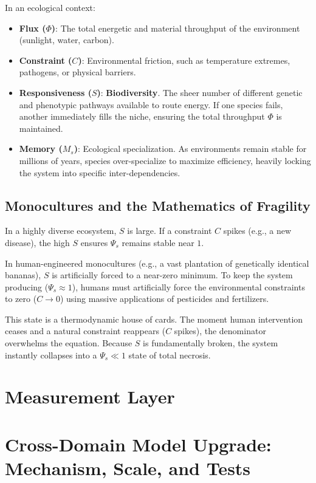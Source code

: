 \documentclass[11pt,a4paper]{article}
\begin{document}
In an ecological context:
\begin{itemize}
    \item \textbf{Flux ($\Phi$)}: The total energetic and material throughput of the environment (sunlight, water, carbon).
    \item \textbf{Constraint ($C$)}: Environmental friction, such as temperature extremes, pathogens, or physical barriers.
    \item \textbf{Responsiveness ($S$)}: \textbf{Biodiversity}. The sheer number of different genetic and phenotypic pathways available to route energy. If one species fails, another immediately fills the niche, ensuring the total throughput $\Phi$ is maintained.
    \item \textbf{Memory ($M_s$)}: Ecological specialization. As environments remain stable for millions of years, species over-specialize to maximize efficiency, heavily locking the system into specific inter-dependencies.
\end{itemize}

\subsection{Monocultures and the Mathematics of Fragility}
In a highly diverse ecosystem, $S$ is large. If a constraint $C$ spikes (e.g., a new disease), the high $S$ ensures $\Psi_s$ remains stable near $1$.

In human-engineered monocultures (e.g., a vast plantation of genetically identical bananas), $S$ is artificially forced to a near-zero minimum. To keep the system producing ($\Psi_s \approx 1$), humans must artificially force the environmental constraints to zero ($C \to 0$) using massive applications of pesticides and fertilizers.

This state is a thermodynamic house of cards. The moment human intervention ceases and a natural constraint reappears ($C$ spikes), the denominator overwhelms the equation. Because $S$ is fundamentally broken, the system instantly collapses into a $\Psi_s \ll 1$ state of total necrosis.



\section{Measurement Layer}

\section{Cross-Domain Model Upgrade: Mechanism, Scale, and Tests}
\end{document}
